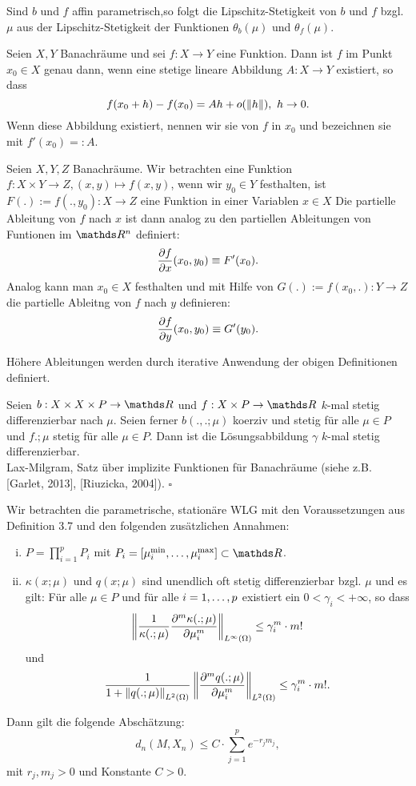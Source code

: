Sind $b$ und $f$ affin parametrisch,so folgt die Lipschitz-Stetigkeit von $b$ und $f$ bzgl. $\mu$ aus der Lipschitz-Stetigkeit der Funktionen $\theta_b(\mu)$ und $\theta_f(\mu)$.

Seien $X,Y$ Banachräume und sei $f:X\to Y$ eine Funktion.
Dann ist $f$  im Punkt $x_0\in X$ genau dann, wenn eine stetige lineare Abbildung $A:X\to Y$ existiert, so dass
\[
f(x_0+h)-f(x_0) = Ah + o(\left\Vert h\right\Vert),~h\to 0.
\]
Wenn diese Abbildung existiert, nennen wir sie  von $f$ in $x_0$ und bezeichnen sie mit $f'(x_0) =: A$.

Seien $X,Y,Z$ Banachräume.
Wir betrachten eine Funktion $f:X\times Y\to Z, (x,y)\mapsto f(x,y)$, wenn wir $y_0\in Y$ festhalten, ist $F(.) := f(.,y_0):X\to Z$ eine Funktion in einer Variablen $x\in X$
Die partielle Ableitung von $f$ nach $x$ ist dann analog zu den partiellen Ableitungen von Funtionen im $\R^n$ definiert:
\[
\frac{\partial f}{\partial x}  (x_0,y_0) \equiv F'(x_0).
\]
Analog kann man $x_0\in X$ festhalten und mit Hilfe von $G(.):= f(x_0,.):Y\to Z$ die partielle Ableitng von $f$ nach $y$ definieren:
\[
\frac{\partial f}{\partial y}  (x_0,y_0) \equiv G'(y_0).
\]

Höhere Ableitungen werden durch iterative Anwendung der obigen Definitionen definiert.
 
Seien $b:X\times X\times P\to \R$ und $f:X\times P\to \R$ $k$-mal stetig differenzierbar nach $\mu$.
Seien ferner $b(.,.;\mu)$ koerziv und stetig für alle $\mu\in P$ und $f.;\mu$ stetig für alle $\mu\in P$.
Dann ist die Lösungsabbildung $\gamma$ $k$-mal stetig differenzierbar.\\

 Lax-Milgram, Satz über implizite Funktionen für Banachräume (siehe z.B. [Garlet, 2013], [Riuzicka, 2004]).
\hfill $\square$

Wir betrachten die parametrische, stationäre WLG mit den Voraussetzungen aus Definition 3.7 und den folgenden zusätzlichen Annahmen:
\begin{enumerate}[(i)]
	\item $P = \prod_{i=1}^{p} P_i$ mit $P_i  =[\mu_i^{\min}\dt{,}\mu_i^{\max}]\subset \R$.
	\item $\kappa(x;\mu)$ und $q(x;\mu)$ sind unendlich oft stetig differenzierbar bzgl. $\mu$ und es gilt:
	Für alle $\mu\in P$ und für alle $i=1, \dots ,p$ existiert ein $0<\gamma_i<+\infty$, so dass
	\[
	\left\Vert\frac{1}{\kappa(.;\mu)} \frac{\partial^m \kappa(.;\mu)}{\partial \mu_i^m}\right\Vert_{L^\infty(\Omega)} \le \gamma_i^m \cdot m!
	\]
	und
	\[
	\frac{1}{1+\left\Vert q(.;\mu)\right\Vert_{L^2(\Omega)}} \left\Vert\frac{\partial^m q(.;\mu)}{\partial \mu_i^m} \right\Vert_{L^2(\Omega)} \le \gamma_i^m\cdot m!.
	\]	 
\end{enumerate}
 Dann gilt die folgende Abschätzung:
\[
d_n(M,X_n) \le C\cdot \sum_{j=1}^{p} e^{-r_jm_j},
\]
mit $r_j,m_j >0$ und Konstante $C>0$.\\

